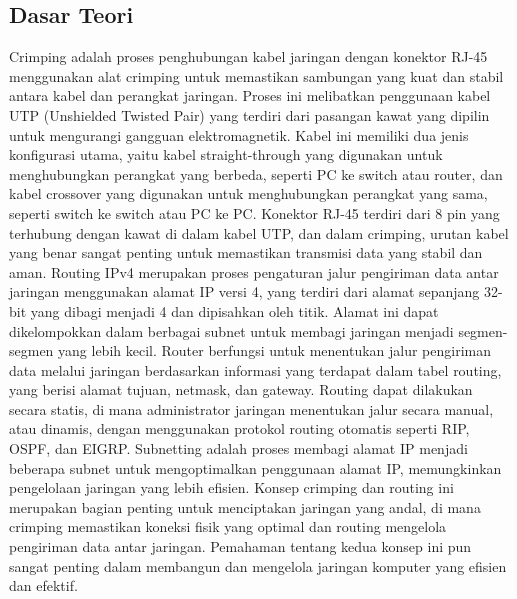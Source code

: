\subsection{Dasar Teori}
Crimping adalah proses penghubungan kabel jaringan dengan konektor RJ-45 menggunakan alat crimping untuk memastikan sambungan yang kuat dan stabil antara kabel dan perangkat jaringan. Proses ini melibatkan penggunaan kabel UTP (Unshielded Twisted Pair) yang terdiri dari pasangan kawat yang dipilin untuk mengurangi gangguan elektromagnetik. Kabel ini memiliki dua jenis konfigurasi utama, yaitu kabel straight-through yang digunakan untuk menghubungkan perangkat yang berbeda, seperti PC ke switch atau router, dan kabel crossover yang digunakan untuk menghubungkan perangkat yang sama, seperti switch ke switch atau PC ke PC. Konektor RJ-45 terdiri dari 8 pin yang terhubung dengan kawat di dalam kabel UTP, dan dalam crimping, urutan kabel yang benar sangat penting untuk memastikan transmisi data yang stabil dan aman. Routing IPv4 merupakan proses pengaturan jalur pengiriman data antar jaringan menggunakan alamat IP versi 4, yang terdiri dari alamat sepanjang 32-bit yang dibagi menjadi 4 dan dipisahkan oleh titik. Alamat ini dapat dikelompokkan dalam berbagai subnet untuk membagi jaringan menjadi segmen-segmen yang lebih kecil. Router berfungsi untuk menentukan jalur pengiriman data melalui jaringan berdasarkan informasi yang terdapat dalam tabel routing, yang berisi alamat tujuan, netmask, dan gateway. Routing dapat dilakukan secara statis, di mana administrator jaringan menentukan jalur secara manual, atau dinamis, dengan menggunakan protokol routing otomatis seperti RIP, OSPF, dan EIGRP. Subnetting adalah proses membagi alamat IP menjadi beberapa subnet untuk mengoptimalkan penggunaan alamat IP, memungkinkan pengelolaan jaringan yang lebih efisien. Konsep crimping dan routing ini merupakan bagian penting untuk menciptakan jaringan yang andal, di mana crimping memastikan koneksi fisik yang optimal dan routing mengelola pengiriman data antar jaringan. Pemahaman tentang kedua konsep ini pun sangat penting dalam membangun dan mengelola jaringan komputer yang efisien dan efektif.


